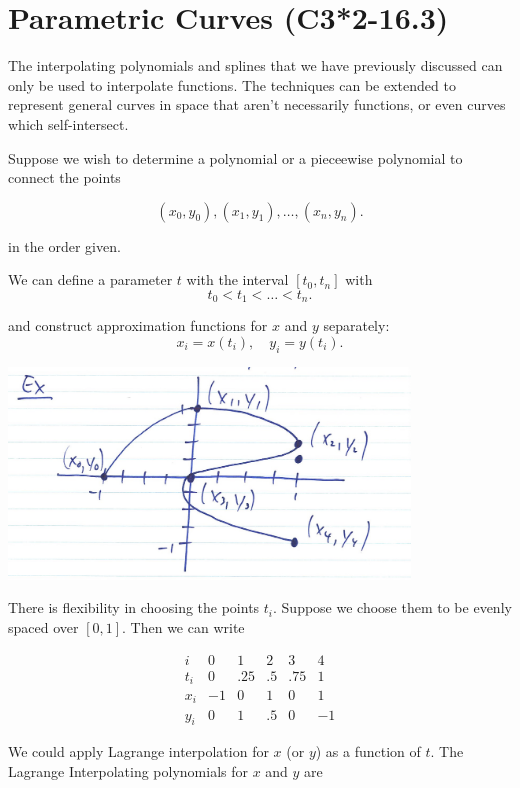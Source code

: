 \section{Parametric Curves (C3*2-16.3)}

The interpolating polynomials and splines that we have previously discussed can
only be used to interpolate functions. The techniques can be extended to
represent general curves in space that aren't necessarily functions, or even
curves which self-intersect. %

Suppose we wish to determine a polynomial or a pieceewise polynomial to connect
the points 

\[
(x_0, y_0), (x_1, y_1), \dots, (x_n, y_n) 
.\]

in the order given.

We can define a parameter $t$ with the interval $[t_0, t_n]$ with
\[
t_0 < t_1 < \dots < t_n
.\]

and construct approximation functions for $x$ and $y$ separately:
\[
x_i = x(t_i), \quad y_i = y(t_i)
.\]

\pagebreak
\Ex
\begin{center}
  \includegraphics[width=0.8\textwidth]{./assets/parametric_curves_1.jpg}
\end{center}

There is flexibility in choosing the points $t_i$. Suppose we choose them to be
evenly spaced over $[0, 1]$. Then we can write

\[
\begin{array}{c|ccccc}
i & 0 & 1 & 2 & 3 & 4 \\ \hline
t_i & 0 & .25 & .5 & .75 & 1 \\
x_i & -1 & 0 & 1 & 0 & 1 \\
y_i & 0 & 1 & .5 & 0 & -1
\end{array}
\]

We could apply Lagrange interpolation for $x$ (or $y$) as a function of $t$.
The Lagrange Interpolating polynomials for $x$ and $y$ are

